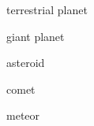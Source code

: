 \documentclass{article}
\begin{document}
\gls{terrestrial planet}

\gls{giant planet}

\gls{asteroid}

\gls{comet}

\gls{meteor}

\clearpage

\printglossaries
\end{document}
